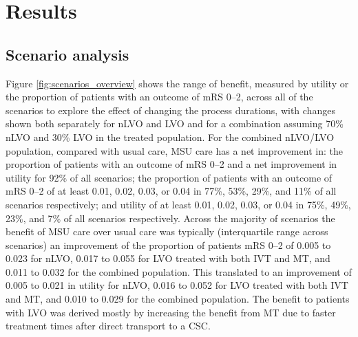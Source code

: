 \section{Results}

\subsection{Scenario analysis}

Figure \ref{fig:scenarios_overview} shows the range of benefit, measured by utility or the proportion of patients with an outcome of mRS 0--2, across all of the scenarios to explore the effect of changing the process durations, with changes shown both separately for nLVO and LVO and for a combination assuming 70\% nLVO and 30\% LVO in the treated population.
For the combined nLVO/LVO population, compared with usual care, MSU care has a net improvement in:
the proportion of patients with an outcome of mRS 0--2 and a net improvement in utility for 92\% of all scenarios;
the proportion of patients with an outcome of mRS 0--2 of at least 0.01, 0.02, 0.03, or 0.04 in 77\%, 53\%, 29\%, and 11\% of all scenarios respectively;
and utility of at least 0.01, 0.02, 0.03, or 0.04 in 75\%, 49\%, 23\%, and 7\% of all scenarios respectively.
Across the majority of scenarios the benefit of MSU care over usual care was typically (interquartile range across scenarios) an improvement of the proportion of patients mRS 0--2 of 0.005 to 0.023 for nLVO, 0.017 to 0.055 for LVO treated with both IVT and MT, and 0.011 to 0.032 for the combined population. This translated to an improvement of 0.005 to 0.021 in utility for nLVO, 0.016 to 0.052 for LVO treated with both IVT and MT, and 0.010 to 0.029 for the combined population. 
The benefit to patients with LVO was derived mostly by increasing the benefit from MT due to faster treatment times after direct transport to a CSC.

